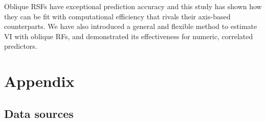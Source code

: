 \documentclass[12pt]{article}\usepackage[]{graphicx}\usepackage[]{xcolor}
\begin{document}
Oblique RSFs have exceptional prediction accuracy and this study has shown how they can be fit with computational efficiency that rivals their axis-based counterparts. We have also introduced a general and flexible method to estimate VI with oblique RFs, and demonstrated its effectiveness for numeric, correlated predictors.

\appendix

\section*{Appendix}
\captionsetup{labelformat=AppendixTables}
\setcounter{table}{0}

\subsection*{Data sources}
\end{document}
